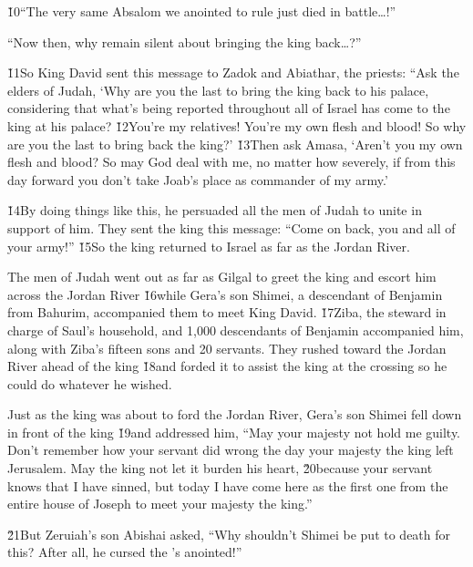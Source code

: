 \v{10}``The very same Absalom we anointed to rule just died in battle{\ldots}!''

``Now then, why remain silent about bringing the king back{\ldots}?''

\v{11}So King David sent this message to Zadok and Abiathar, the priests: ``Ask the elders of Judah, `Why are you the last to bring the king back to his palace, considering that what's being reported throughout all of Israel has come to the king at his palace? \v{12}You're my relatives! You're my own flesh and blood! So why are you the last to bring back the king?' \v{13}Then ask Amasa, `Aren't you my own flesh and blood? So may God deal with me, no matter how severely, if from this day forward you don't take Joab's place as commander of my army.'

\v{14}By doing things like this, he persuaded all the men of Judah to unite in support of him. They sent the king this message: ``Come on back, you and all of your army!'' \v{15}So the king returned to Israel as far as the Jordan River.

The men of Judah went out as far as Gilgal to greet the king and escort him across the Jordan River \v{16}while Gera's son Shimei, a descendant of Benjamin from Bahurim, accompanied them to meet King David. \v{17}Ziba, the steward in charge of Saul's household, and 1,000 descendants of Benjamin accompanied him, along with Ziba's fifteen sons and 20 servants. They rushed toward the Jordan River ahead of the king \v{18}and forded it to assist the king at the crossing so he could do whatever he wished.

Just as the king was about to ford the Jordan River, Gera's son Shimei fell down in front of the king \v{19}and addressed him, ``May your majesty not hold me guilty. Don't remember how your servant did wrong the day your majesty the king left Jerusalem. May the king not let it burden his heart, \v{20}because your servant knows that I have sinned, but today I have come here as the first one from the entire house of Joseph to meet your majesty the king.''

\v{21}But Zeruiah's son Abishai asked, ``Why shouldn't Shimei be put to death for this? After all, he cursed the 's anointed!''

